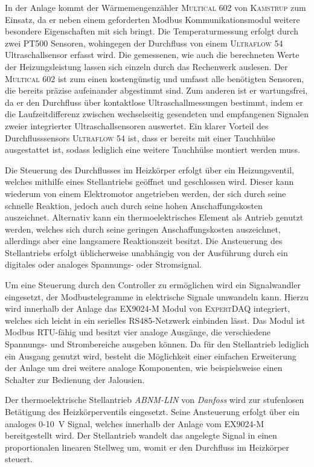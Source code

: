 In der Anlage kommt der Wärmemengenzähler \textsc{Multical 602} von \textsc{Kamstrup} zum Einsatz, da er neben einem geforderten Modbus Kommunikationsmodul weitere besondere Eigenschaften mit sich bringt. Die Temperaturmessung erfolgt durch zwei PT500 Sensoren, wohingegen der Durchfluss von einem \textsc{Ultraflow 54} Ultraschallsensor erfasst wird. Die gemessenen, wie auch die berechneten Werte der Heizungsleistung lassen sich einzeln durch das Rechenwerk auslesen.
Der \textsc{Multical 602} ist zum einen kostengünstig und umfasst alle benötigten Sensoren, die bereits präzise aufeinander abgestimmt sind. Zum anderen ist er wartungsfrei, da er den Durchfluss über kontaktlose Ultraschallmessungen bestimmt, indem er die Laufzeitdifferenz zwischen wechselseitig gesendeten und empfangenen Signalen zweier integrierter Ultraschallsensoren auswertet. Ein klarer Vorteil des Durchflusssensors \textsc{Ultraflow 54} ist, dass er bereits mit einer Tauchhülse ausgestattet ist, sodass lediglich eine weitere Tauchhülse montiert werden muss.


Die Steuerung des Durchflusses im Heizkörper erfolgt über ein Heizungsventil, welches mithilfe eines Stellantriebs geöffnet und geschlossen wird. Dieser kann wiederum von einem Elektromotor angetrieben werden, der sich durch seine schnelle Reaktion, jedoch auch durch seine hohen Anschaffungskosten auszeichnet. Alternativ kann ein thermoelektrisches Element als Antrieb genutzt werden, welches sich durch seine geringen Anschaffungskosten auszeichnet, allerdings aber eine langsamere Reaktionszeit besitzt. Die Ansteuerung des Stellantriebs erfolgt üblicherweise unabhängig von der Ausführung durch ein digitales oder analoges Spannungs- oder Stromsignal.

Um eine Steuerung durch den Controller zu ermöglichen wird ein Signalwandler eingesetzt, der Modbustelegramme in elektrische Signale umwandeln kann. Hierzu wird innerhalb der Anlage das \textsc{EX9024-M} Modul von \textsc{ExpertDAQ} integriert, welches sich leicht in ein serielles RS485-Netzwerk einbinden lässt. Das Modul ist Modbus RTU-fähig und besitzt vier analoge Ausgänge, die verschiedene Spannungs- und Strombereiche ausgeben können. Da für den Stellantrieb lediglich ein Ausgang genutzt wird, besteht die Möglichkeit einer einfachen Erweiterung der Anlage um drei weitere analoge Komponenten, wie beispielsweise einen Schalter zur Bedienung der Jalousien.

Der thermoelektrische Stellantrieb \textit{ABNM-LIN} von \textit{Danfoss} wird zur stufenlosen Betätigung des Heizkörperventils eingesetzt. Seine Ansteuerung erfolgt über ein analoges 0-10~V Signal, welches innerhalb der Anlage vom EX9024-M bereitgestellt wird. Der Stellantrieb wandelt das angelegte Signal in einen proportionalen linearen Stellweg um, womit er den Durchfluss im Heizkörper steuert.


